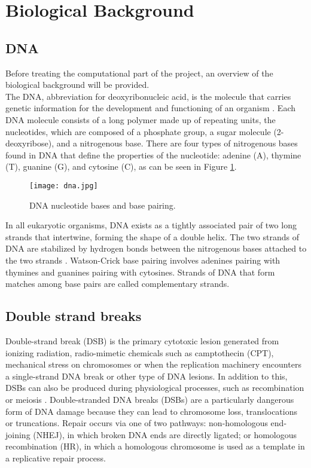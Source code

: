 \section{Biological Background}

\subsection{DNA}

Before treating the computational part of the project, an overview of the biological background will be provided. \\
The DNA, abbreviation for deoxyribonucleic acid, is the molecule that carries genetic information for the development and functioning of an organism \cite{noauthor_deoxyribonucleic_nodate}. Each DNA molecule consists of a long polymer made up of repeating units, the nucleotides, which are composed of a phosphate group, a sugar molecule (2-deoxyribose), and a nitrogenous base. There are four types of nitrogenous bases found in DNA that define the properties of the nucleotide: adenine (A), thymine (T), guanine (G), and cytosine (C), as can be seen in Figure \ref{fig:dna}.\\

\begin{figure}[h]

  \centering
    \texttt{[image: dna.jpg]}

  \caption{DNA nucleotide bases and base pairing.}
  \label{fig:dna}
\end{figure}

In all eukaryotic organisms, DNA exists as a tightly associated pair of two long strands that intertwine, forming the shape of a double helix. The two strands of DNA are stabilized by hydrogen bonds between the nitrogenous bases attached to the two strands \cite{carter_chapter_2022}. Watson-Crick base pairing involves adenines pairing with thymines and guanines pairing with cytosines. Strands of DNA that form matches among base pairs are called complementary strands. \\

\subsection{Double strand breaks}

Double-strand break (DSB) is the primary cytotoxic lesion generated from ionizing radiation, radio-mimetic chemicals such as camptothecin (CPT), mechanical stress on chromosomes or when the replication machinery encounters a single-strand DNA break or other type of DNA lesions. In addition to this, DSBs can also be produced during physiological processes, such as recombination or meiosis \cite{ting_rad18_2010}.
Double-stranded DNA breaks (DSBs) are a particularly dangerous form of DNA damage because they can lead to chromosome loss, translocations or truncations. Repair occurs via one of two pathways: non-homologous end-joining (NHEJ), in which broken DNA ends are directly ligated; or homologous recombination (HR), in which a homologous chromosome is used as a template in a replicative repair process. 

